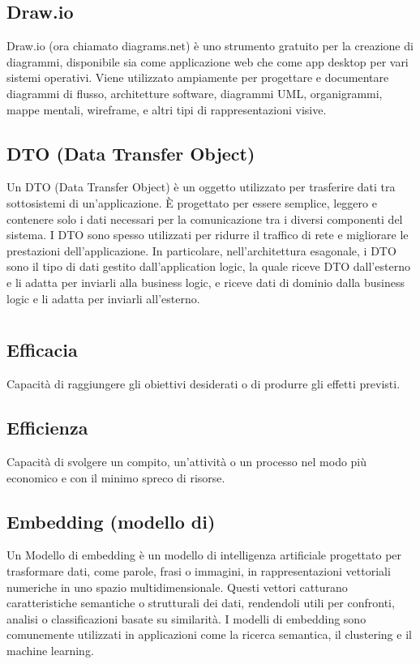 \subsection*{Draw.io}
Draw.io (ora chiamato diagrams.net) è uno strumento gratuito per la creazione di diagrammi, disponibile sia come applicazione web che come app desktop per 
vari sistemi operativi. Viene utilizzato ampiamente per progettare e documentare diagrammi di flusso, architetture software, diagrammi UML, organigrammi, 
mappe mentali, wireframe, e altri tipi di rappresentazioni visive.

\hypertarget{sec:dto}{}
\subsection*{DTO (Data Transfer Object)}
Un DTO (Data Transfer Object) è un oggetto utilizzato per trasferire dati tra sottosistemi di un'applicazione. È progettato per essere semplice, leggero e
contenere solo i dati necessari per la comunicazione tra i diversi componenti del sistema. I DTO sono spesso utilizzati per ridurre il traffico di rete e
migliorare le prestazioni dell'applicazione. In particolare, nell'architettura esagonale, i DTO sono il tipo di dati gestito dall'application logic,
la quale riceve DTO dall'esterno e li adatta per inviarli alla business logic, e riceve dati di dominio dalla business logic e li adatta per inviarli
all'esterno.

\newpage



\section{}

\hypertarget{sec:efficacia}{}
\subsection*{Efficacia}
Capacità di raggiungere gli obiettivi desiderati o di produrre gli effetti previsti.

\hypertarget{sec:efficienza}{}
\subsection*{Efficienza}
Capacità di svolgere un compito, un'attività o un processo nel modo più economico e con il minimo spreco di risorse.

\hypertarget{sec:embedding}{}
\subsection*{Embedding (modello di)}
Un Modello di embedding è un modello di intelligenza artificiale progettato per trasformare dati, come parole, frasi o immagini, in rappresentazioni 
vettoriali numeriche in uno spazio multidimensionale. Questi vettori catturano caratteristiche semantiche o strutturali dei dati, rendendoli utili per 
confronti, analisi o classificazioni basate su similarità. I modelli di embedding sono comunemente utilizzati in applicazioni come la ricerca semantica, 
il clustering e il machine learning.

